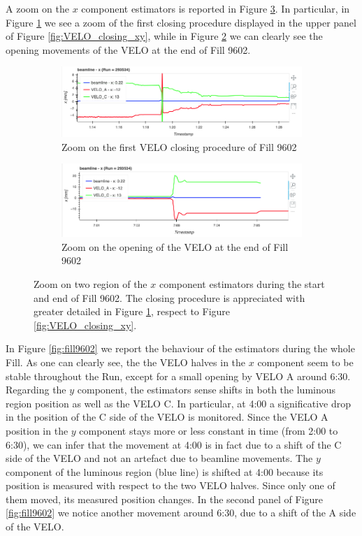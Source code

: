 A zoom on the $x$ component estimators is reported in Figure \ref{zoom_velo}. In particular, in Figure \ref{fig:velo_closing_zoom} we see a zoom of the first closing procedure displayed in the upper panel of Figure \ref{fig:VELO_closing_xy}, while in Figure \ref{fig:velo_opens_zoom} we can clearly see the opening movements of the VELO at the end of Fill 9602.

\begin{figure}
    \centering
    \begin{subfigure}{0.8\textwidth}
    \includegraphics[width=\linewidth]{figures/Velo_closing_zoom.png}
    \caption{Zoom on the first VELO closing procedure of Fill 9602}
    \label{fig:velo_closing_zoom}
    \end{subfigure}\hfill
    \begin{subfigure}{0.8\textwidth}
    \includegraphics[width=\linewidth]{figures/VELO_opens_zoom.png}
    \caption{Zoom on the opening of the VELO at the end of Fill 9602}
    \label{fig:velo_opens_zoom}
    \end{subfigure}
    \caption{Zoom on two region of the $x$ component estimators during the start and end of Fill 9602. The closing procedure is appreciated with greater detailed in Figure \ref{fig:velo_closing_zoom}, respect to Figure \ref{fig:VELO_closing_xy}.}\label{zoom_velo}
\end{figure}
In Figure \ref{fig:fill9602} we report the behaviour of the estimators during the whole Fill. As one can clearly see, the the VELO halves in the $x$ component seem to be stable throughout the Run, except for a small opening by VELO A around 6:30. Regarding the $y$ component, the estimators sense shifts in both the luminous region position as well as the VELO C. In particular, at 4:00 a significative drop in the position of the C side of the VELO is monitored. Since the VELO A position in the $y$ component stays more or less constant in time (from 2:00 to 6:30), we can infer that the movement at 4:00 is in fact due to a shift of the C side of the VELO and not an artefact due to beamline movements. The $y$ component of the luminous region (blue line) is shifted at 4:00 because its position is measured with respect to the two VELO halves. Since only one of them moved, its measured position changes. In the second panel of Figure \ref{fig:fill9602} we notice another movement around 6:30, due to a shift of the A side of the VELO.
